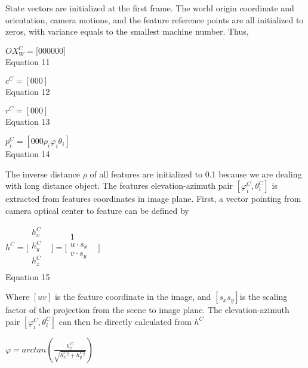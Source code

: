 State vectors are initialized at the first frame. The world origin 
coordinate and orientation, camera motions, and the feature reference 
points are all initialized to zeros, with variance equals to the 
smallest machine number. Thus, 

$OX_{W}^{C}=\lbrack 0 0 0 0 0 0\rbrack $\\


Equation 11

$c^{C}=[0 0 0]$\\


Equation 12

$r^{C}=[0 0 0]$\\


Equation 13

$p_{i}^{C}=[0 0 0 \rho _{i}\varphi _{i}\theta _{i} ]$\\


Equation 14

The inverse distance $\rho $ of all features are initialized to 0.1 
because we are dealing with long distance object. The features 
elevation-azimuth pair $[\varphi _{i}^{C}, \theta _{i}^{C}]$ is 
extracted from features coordinates in image plane. First, a vector 
pointing from camera optical center to feature can be defined by

$h^{C}=\lbrack \begin{matrix}
h_{x}^{C} & \\
h_{y}^{C} & \\
h_{z}^{C} & \\
\end{matrix}
\rbrack =\lbrack \begin{matrix}
1 & \\
u\cdot s_{x} & \\
v\cdot s_{y} & \\
\end{matrix}
\rbrack $\\


Equation 15

Where $[u v]$ is the feature coordinate in the image, and $
[s_{x}s_{y}] $is the scaling factor of the projection from the scene to 
image plane. The elevation-azimuth pair $[\varphi _{i}^{C}, \theta 
_{i}^{C}]$ can then be directly calculated from $h^{C}$

\begin{center}$\varphi 
=arctan(\frac{h_{z}^{C}}{\sqrt{h_{x}^{C}^{2}+h_{y}^{C}^{2}}})$\\
\end{center}

